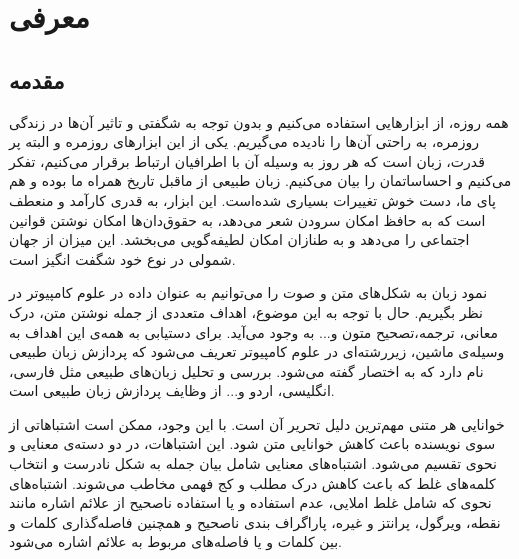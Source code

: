 \chapter{معرفی}

\section{مقدمه}
\hspace{30pt}
همه روزه، از ابزارهایی استفاده می‌کنیم و بدون توجه به شگفتی و تاثیر آن‌ها در زندگی روزمره، به راحتی آن‌ها را  نادیده می‌گیریم. یکی از این ابزارهای روزمره و البته پر قدرت، زبان است که هر روز به وسیله آن با اطرافیان ارتباط برقرار می‌کنیم، تفکر می‌کنیم و احساساتمان را بیان می‌کنیم. زبان طبیعی از ماقبل تاریخ همراه ما بوده و هم پای ما، دست خوش تغییرات بسیاری شده‌است. این ابزار، به قدری کارآمد و منعطف است که به حافظ امکان سرودن شعر می‌دهد، به حقوق‌دان‌ها امکان نوشتن قوانین اجتماعی را می‌دهد و به طنازان امکان لطیفه‌گویی می‌بخشد.  این میزان از جهان شمولی در نوع خود شگفت انگیز است.

 نمود زبان به شکل‌های متن و صوت را می‌توانیم به عنوان داده در علوم کامپیوتر در نظر بگیریم. حال با توجه به این موضوع، اهداف متعددی از جمله نوشتن متن، درک معانی، ترجمه،تصحیح متون و... به وجود می‌آید. برای دستیابی به همه‌ی این اهداف به وسیله‌ی ماشین، زیر‌رشته‌ای در علوم کامپیوتر تعریف می‌شود که پردازش زبان طبیعی نام دارد که به اختصار  گفته می‌شود. بررسی و تحلیل زبان‌های طبیعی مثل فارسی، انگلیسی، اردو و... از وظایف پردازش زبان طبیعی است.

خوانایی هر متنی مهم‌ترین دلیل تحریر آن است. با این وجود، ممکن است اشتباهاتی از سوی نویسنده باعث کاهش خوانایی متن شود. این اشتباهات، در دو دسته‌ی معنایی و نحوی تقسیم می‌شود. اشتباه‌های معنایی شامل بیان جمله به شکل نادرست و انتخاب کلمه‌های غلط که باعث کاهش درک مطلب و کج فهمی مخاطب می‌شوند. اشتباه‌های نحوی که شامل غلط املایی، عدم استفاده و یا استفاده ناصحیح از علائم اشاره مانند نقطه، ویرگول، پرانتز و غیره، پاراگراف بندی ناصحیح و همچنین فاصله‌گذاری کلمات و بین کلمات و یا فاصله‌های مربوط به علائم اشاره می‌شود.

